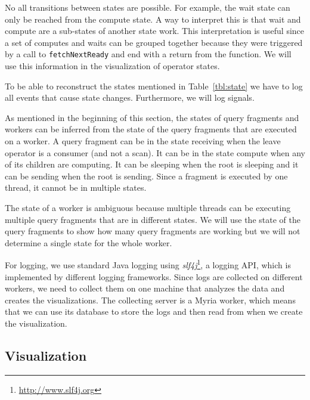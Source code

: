 \documentclass[11pt]{scrartcl}
\begin{document}
No all transitions between states are possible. For example, the wait state can only be reached from the compute state. A way to interpret this is that wait and compute are a sub-states of another state work. This interpretation is useful since a set of computes and waits can be grouped together because they were triggered by a call to \texttt{fetchNextReady} and end with a return from the function. We will use this information in the visualization of operator states.

To be able to reconstruct the states mentioned in Table~\ref{tbl:state} we have to log all events that cause state changes. Furthermore, we will log signals. %

As mentioned in the beginning of this section, the states of query fragments and workers can be inferred from the state of the query fragments that are executed on a worker. A query fragment can be in the state receiving when the leave operator is a consumer (and not a scan). It can be in the state compute when any of its children are computing. It can be sleeping when the root is sleeping and it can be sending when the root is sending. Since a fragment is executed by one thread, it cannot be in multiple states.

The state of a worker is ambiguous because multiple threads can be executing multiple query fragments that are in different states. We will use the state of the query fragments to show how many query fragments are working but we will not determine a single state for the whole worker.


For logging, we use standard Java logging using \emph{slf4j}\footnote{\url{http://www.slf4j.org}}, a logging API, which is implemented by different logging frameworks. Since logs are collected on different workers, we need to collect them on one machine that analyzes the data and creates the visualizations. The collecting server is a Myria worker, which means that we can use its database to store the logs and then read from when we create the visualization.


\subsection{Visualization}
\label{sec:visualization}
\end{document}
